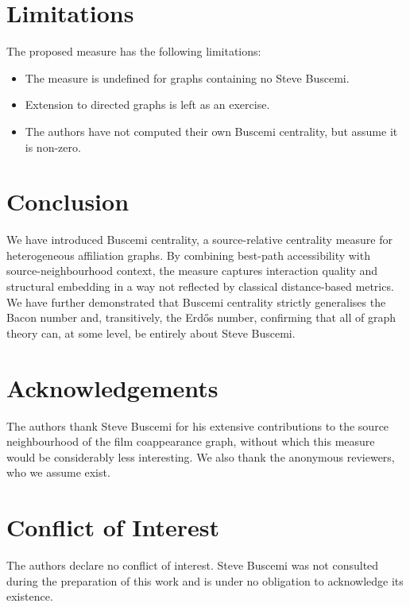 \documentclass[11pt]{article}
\begin{document}
\section{Limitations}

The proposed measure has the following limitations:

\begin{itemize}
\item The measure is undefined for graphs containing no Steve Buscemi.
\item Extension to directed graphs is left as an exercise.
\item The authors have not computed their own Buscemi centrality, but assume it is non-zero.
\end{itemize}

\section{Conclusion}

We have introduced Buscemi centrality, a source-relative centrality measure for heterogeneous affiliation graphs. By combining best-path accessibility with source-neighbourhood context, the measure captures interaction quality and structural embedding in a way not reflected by classical distance-based metrics. We have further demonstrated that Buscemi centrality strictly generalises the Bacon number and, transitively, the Erd\H{o}s number, confirming that all of graph theory can, at some level, be entirely about Steve Buscemi.

\section*{Acknowledgements}

The authors thank Steve Buscemi for his extensive contributions to the source neighbourhood of the film coappearance graph, without which this measure would be considerably less interesting. We also thank the anonymous reviewers, who we assume exist.

\section*{Conflict of Interest}

The authors declare no conflict of interest. Steve Buscemi was not consulted during the preparation of this work and is under no obligation to acknowledge its existence.



\end{document}
